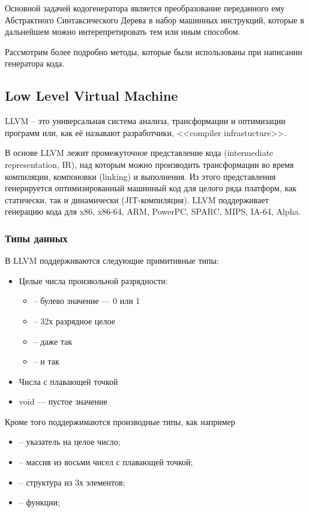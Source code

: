 Основной задачей кодогенератора является преобразование
переданного ему Абстрактного Синтаксического Дерева в
набор машинных инструкций, которые в дальнейшем можно интерепретировать
тем или иным способом.

Рассмотрим более подробно методы, которые были использованы при написании генератора кода.

\subsection{Low Level Virtual Machine}

LLVM -- это универсальная система анализа, трансформации и оптимизации программ или, как её называют разработчики, <<compiler
infrastucture>>.

В основе LLVM лежит промежуточное представление кода (intermediate representation, IR), над которым можно производить
трансформации во время компиляции, компоновки (linking) и выполнения. Из этого представления генерируется оптимизированный
машинный код для целого ряда платформ, как статически, так и динамически (JIT-компиляция). LLVM поддерживает генерацию кода для
x86, x86-64, ARM, PowerPC, SPARC, MIPS, IA-64, Alpha.

\subsubsection{Типы данных}

В LLVM поддерживаются следующие примитивные типы:
\begin{itemize}
    \item Целые числа произвольной разрядности:
        \begin{itemize}
            \item {} -- булево значение — 0 или 1
            \item {} -- 32х разрядное целое
            \item {} -- даже так
            \item {} -- и так
        \end{itemize}
    \item Числа с плавающей точкой
    \item void — пустое значение
\end{itemize}

Кроме того поддержимаются производные типы, как например
\begin{itemize}
    \item {} -- указатель на целое число;
    \item \icode{[8 x double]} -- массив из восьми чисел с плавающей точкой;
    \item {} -- структура из 3х элементов;
    \item {} -- функции;
\end{itemize}

